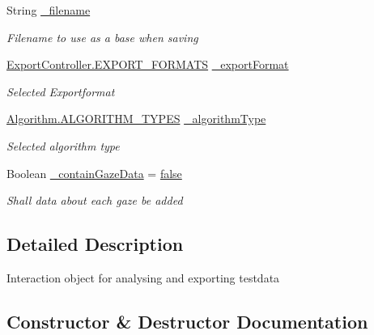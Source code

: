 \begin{DoxyCompactItemize}
String \hyperlink{class_web_analyzer_1_1_u_i_1_1_interaction_objects_1_1_analysis_export_control_a281522ffdb5738b1c5f7609bc61e6358}{\+\_\+filename}
\begin{DoxyCompactList}\small\item\em Filename to use as a base when saving \end{DoxyCompactList}\item 
\hyperlink{class_web_analyzer_1_1_controller_1_1_export_controller_a8cea4a311ecaf495f305f9d7829a57aa}{Export\+Controller.\+E\+X\+P\+O\+R\+T\+\_\+\+F\+O\+R\+M\+A\+T\+S} \hyperlink{class_web_analyzer_1_1_u_i_1_1_interaction_objects_1_1_analysis_export_control_a941e74e9bf284b29110295a481b31697}{\+\_\+export\+Format}
\begin{DoxyCompactList}\small\item\em Selected Exportformat \end{DoxyCompactList}\item 
\hyperlink{class_web_analyzer_1_1_models_1_1_algorithm_model_1_1_algorithm_a170e7786e033cbd0c09cabb30030794b}{Algorithm.\+A\+L\+G\+O\+R\+I\+T\+H\+M\+\_\+\+T\+Y\+P\+E\+S} \hyperlink{class_web_analyzer_1_1_u_i_1_1_interaction_objects_1_1_analysis_export_control_a92c996b73e5cde9c50d25355e47fb423}{\+\_\+algorithm\+Type}
\begin{DoxyCompactList}\small\item\em Selected algorithm type \end{DoxyCompactList}\item 
Boolean \hyperlink{class_web_analyzer_1_1_u_i_1_1_interaction_objects_1_1_analysis_export_control_aa58521f4baa630aee5ccf3034f74b543}{\+\_\+contain\+Gaze\+Data} = \hyperlink{_u_i_2_h_t_m_l_resources_2js_2src_2export_8js_ae6c865df784842196d411c1466b01686}{false}
\begin{DoxyCompactList}\small\item\em Shall data about each gaze be added \end{DoxyCompactList}\end{DoxyCompactItemize}


\subsection{Detailed Description}
Interaction object for analysing and exporting testdata 



\subsection{Constructor \& Destructor Documentation}
\hypertarget{class_web_analyzer_1_1_u_i_1_1_interaction_objects_1_1_analysis_export_control_a2425c39535e55e12f4ee4975a3176f23}{}
